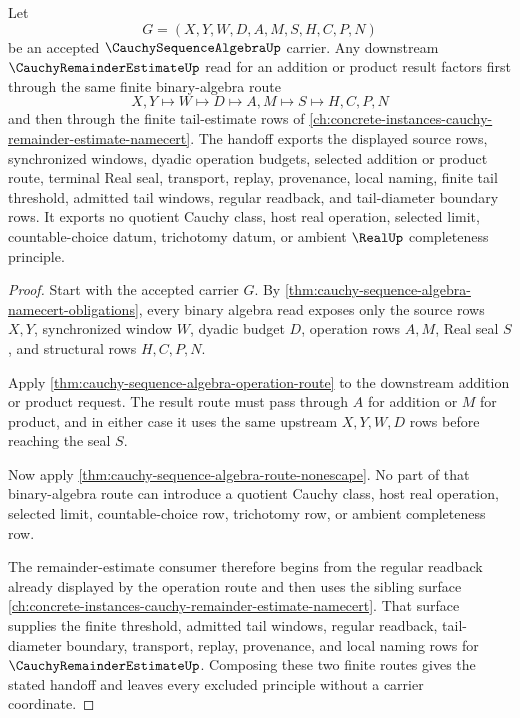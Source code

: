 \begin{theorem}
\label{thm:cauchy-sequence-algebra-remainder-estimate-handoff}
Let
$$
G=(X,Y,W,D,A,M,S,H,C,P,N)
$$
be an accepted $\CauchySequenceAlgebraUp$ carrier. Any downstream $\CauchyRemainderEstimateUp$ read for an addition or product result factors first through the same finite binary-algebra route
$$
X,Y \longmapsto W \longmapsto D \longmapsto A,M \longmapsto S \longmapsto H,C,P,N
$$
and then through the finite tail-estimate rows of \autoref{ch:concrete-instances-cauchy-remainder-estimate-namecert}. The handoff exports the displayed source rows, synchronized windows, dyadic operation budgets, selected addition or product route, terminal Real seal, transport, replay, provenance, local naming, finite tail threshold, admitted tail windows, regular readback, and tail-diameter boundary rows. It exports no quotient Cauchy class, host real operation, selected limit, countable-choice datum, trichotomy datum, or ambient $\RealUp$ completeness principle.
\end{theorem}
\begin{proof}
Start with the accepted carrier $G$. By \autoref{thm:cauchy-sequence-algebra-namecert-obligations}, every binary algebra read exposes only the source rows $X,Y$, synchronized window $W$, dyadic budget $D$, operation rows $A,M$, Real seal $S$, and structural rows $H,C,P,N$.

Apply \autoref{thm:cauchy-sequence-algebra-operation-route} to the downstream addition or product request. The result route must pass through $A$ for addition or $M$ for product, and in either case it uses the same upstream $X,Y,W,D$ rows before reaching the seal $S$.

Now apply \autoref{thm:cauchy-sequence-algebra-route-nonescape}. No part of that binary-algebra route can introduce a quotient Cauchy class, host real operation, selected limit, countable-choice row, trichotomy row, or ambient completeness row.

The remainder-estimate consumer therefore begins from the regular readback already displayed by the operation route and then uses the sibling surface \autoref{ch:concrete-instances-cauchy-remainder-estimate-namecert}. That surface supplies the finite threshold, admitted tail windows, regular readback, tail-diameter boundary, transport, replay, provenance, and local naming rows for $\CauchyRemainderEstimateUp$. Composing these two finite routes gives the stated handoff and leaves every excluded principle without a carrier coordinate.
\end{proof}

